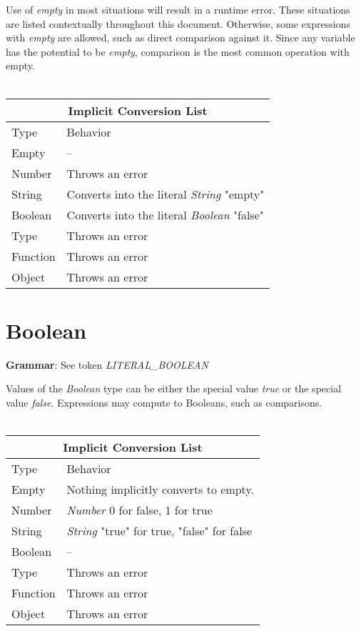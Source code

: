 \documentclass[12pt,letterpaper]{report}
\begin{document}
Use of \textit{empty} in most situations will result in a runtime error. These situations 
are listed contextually throughout this document. Otherwise, some expressions with 
\textit{empty} are allowed, such as direct comparison against it. Since any variable 
has the potential to be \textit{empty}, comparison is the most common operation with 
empty.
\\\\
{
\centering
\begin{tabular}{ |p{2.5cm}||p{10cm}|  }
  \hline
  \multicolumn{2}{|c|}{Implicit Conversion List} \\
  \hline
  Type & Behavior\\
  \hline
  Empty & --\\
  Number  & Throws an error \\
  String & Converts into the literal \textit{String} "empty"\\
  Boolean & Converts into the literal \textit{Boolean} "false"\\
  Type & Throws an error\\
  Function & Throws an error\\
  Object & Throws an error\\
 \hline
\end{tabular}
}




\section{Boolean}\label{Boolean}

\textbf{Grammar}: See token \textit{LITERAL\_BOOLEAN}


Values of the \textit{Boolean} type can be either the special value \textit{true} or 
the special value \textit{false}. Expressions may compute to Booleans, such 
as comparisons.
\\\\
{
\centering
\begin{tabular}{ |p{2.5cm}||p{10cm}|  }
  \hline
  \multicolumn{2}{|c|}{Implicit Conversion List} \\
  \hline
  Type & Behavior\\
  \hline
  Empty & Nothing implicitly converts to empty.\\
  Number  & \textit{Number} 0 for false, 1 for true \\
  String & \textit{String} "true" for true, "false" for false\\
  Boolean & -- \\
  Type & Throws an error\\
  Function & Throws an error\\
  Object & Throws an error\\
 \hline
\end{tabular}
}
\end{document}
